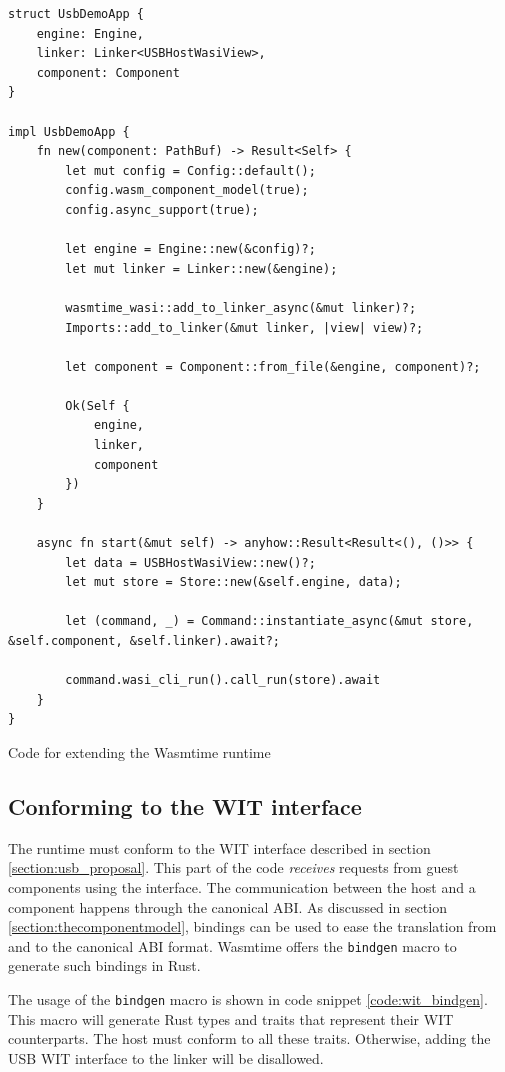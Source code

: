 \begin{code}
\begin{verbatim}
struct UsbDemoApp {
	engine: Engine,
	linker: Linker<USBHostWasiView>,
	component: Component
}

impl UsbDemoApp {
	fn new(component: PathBuf) -> Result<Self> {
		let mut config = Config::default();
		config.wasm_component_model(true);
		config.async_support(true);

		let engine = Engine::new(&config)?;
		let mut linker = Linker::new(&engine);

		wasmtime_wasi::add_to_linker_async(&mut linker)?;
		Imports::add_to_linker(&mut linker, |view| view)?;
		
		let component = Component::from_file(&engine, component)?;

		Ok(Self {
			engine,
			linker,
			component
		})
	}

	async fn start(&mut self) -> anyhow::Result<Result<(), ()>> {
		let data = USBHostWasiView::new()?;
		let mut store = Store::new(&self.engine, data);
	
		let (command, _) = Command::instantiate_async(&mut store, &self.component, &self.linker).await?;
	
		command.wasi_cli_run().call_run(store).await
	}
}
\end{verbatim} 
\caption{Code for extending the Wasmtime runtime}
\label{code:start_component}
\end{code}

\subsection{Conforming to the \acrshort{WIT} interface}
The runtime must conform to the \acrshort{WIT} interface described in section \ref{section:usb_proposal}. This part of the code \textit{receives} requests from guest components using the interface. The communication between the host and a component happens through the canonical ABI. As discussed in section \ref{section:thecomponentmodel}, bindings can be used to ease the translation from and to the canonical ABI format. Wasmtime offers the \texttt{bindgen} macro \cite{wasmtime_component_bindgen} to generate such bindings in Rust.

The usage of the \texttt{bindgen} macro is shown in code snippet \ref{code:wit_bindgen}.
This macro will generate Rust types and traits that represent their \acrshort{WIT} counterparts. The host must conform to all these traits. Otherwise, adding the \acrshort{USB} \acrshort{WIT} interface to the linker will be disallowed.

